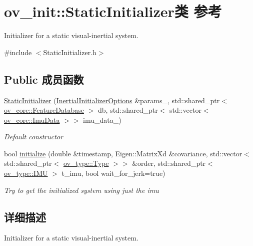 \hypertarget{classov__init_1_1StaticInitializer}{}\section{ov\+\_\+init\+:\+:Static\+Initializer类 参考}
\label{classov__init_1_1StaticInitializer}


Initializer for a static visual-\/inertial system.  




{\ttfamily \#include $<$Static\+Initializer.\+h$>$}

\subsection*{Public 成员函数}
\begin{DoxyCompactItemize}
\item 
\hyperlink{classov__init_1_1StaticInitializer_a7c0e4dfac3e8d54a2303fe2cc3137026}{Static\+Initializer} (\hyperlink{structov__init_1_1InertialInitializerOptions}{Inertial\+Initializer\+Options} \&params\+\_\+, std\+::shared\+\_\+ptr$<$ \hyperlink{classov__core_1_1FeatureDatabase}{ov\+\_\+core\+::\+Feature\+Database} $>$ db, std\+::shared\+\_\+ptr$<$ std\+::vector$<$ \hyperlink{structov__core_1_1ImuData}{ov\+\_\+core\+::\+Imu\+Data} $>$$>$ imu\+\_\+data\+\_\+)
\begin{DoxyCompactList}\small\item\em Default constructor \end{DoxyCompactList}\item 
bool \hyperlink{classov__init_1_1StaticInitializer_af7f232bd33243300a7e0f212efb72232}{initialize} (double \&timestamp, Eigen\+::\+Matrix\+Xd \&covariance, std\+::vector$<$ std\+::shared\+\_\+ptr$<$ \hyperlink{classov__type_1_1Type}{ov\+\_\+type\+::\+Type} $>$$>$ \&order, std\+::shared\+\_\+ptr$<$ \hyperlink{classov__type_1_1IMU}{ov\+\_\+type\+::\+I\+MU} $>$ t\+\_\+imu, bool wait\+\_\+for\+\_\+jerk=true)
\begin{DoxyCompactList}\small\item\em Try to get the initialized system using just the imu \end{DoxyCompactList}\end{DoxyCompactItemize}


\subsection{详细描述}
Initializer for a static visual-\/inertial system. 

